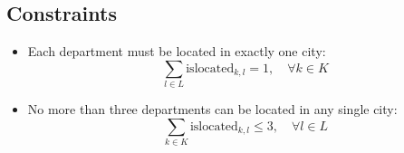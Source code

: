 \documentclass{article}
\begin{document}
\subsection*{Constraints}
\begin{itemize}
    \item Each department must be located in exactly one city:
    \[
    \sum_{l \in L} \text{islocated}_{k, l} = 1, \quad \forall k \in K
    \]
    
    \item No more than three departments can be located in any single city:
    \[
    \sum_{k \in K} \text{islocated}_{k, l} \leq 3, \quad \forall l \in L
    \]
\end{itemize}
\end{document}
